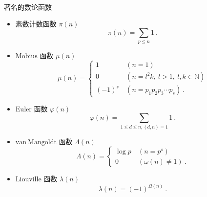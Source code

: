 \begin{example}{著名的数论函数}
\begin{itemize}
\item 素数计数函数 $\pi(n)$
\begin{equation}
\pi(n)=\sum_{p\leq n} 1~.
\end{equation}
\item $\mathrm{M\ddot{o}bius}$ 函数 $\mu(n)$
\begin{equation}
\mu(n)=
\begin{cases}
1&\ (n=1)\\
0&\ (n=l^2k,\ l>1,\ l,k\in\mathbb{N})\\
(-1)^s&\ (n=p_1p_2p_3\cdots p_s)~.
\end{cases}
\end{equation}
\item $\mathrm{Euler}$ 函数 $\varphi(n)$
\begin{equation}
\varphi(n)=\sum_{1\leq d\leq n,(d,n)=1}1~.
\end{equation}
\item $\mathrm{van\ Mangoldt}$ 函数 $\Lambda(n)$
\begin{equation}
\varLambda(n)=
\begin{cases}
\log p&\ (n=p^s)\\
0&\ (\omega(n)\neq 1)~.
\end{cases}
\end{equation}
\item $\mathrm{Liouville}$ 函数 $\lambda(n)$
\begin{equation}
\lambda(n)=(-1)^{\Omega(n)}~.
\end{equation}
\end{itemize}

\end{example}
